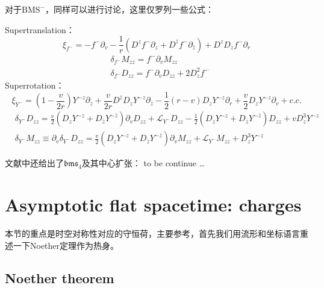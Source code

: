 对于$\text{BMS}^-$，同样可以进行讨论，这里仅罗列一些公式：

\noindent Supertranslation：
\begin{equation}
	\xi_{f^-}=-f^-\partial_v-\frac{1}{r}\left(D^zf^-\partial_z+D^{\bar z}f^-\partial_{\bar z}\right)+D^zD_zf^-\partial_r
\end{equation}
\begin{equation}
	\begin{aligned}
		&\delta_{f^-}M_{zz}=f^-\partial_v M_{zz}\\
		&\delta_{f^-}D_{zz}=f^-\partial_v D_{zz}+2D_z^2f^-
	\end{aligned}
\end{equation}
Superrotation：
\begin{equation}
	\xi_{Y^-}=\left(1-\frac{v}{2r}\right)Y^{-z}\partial_z+\frac{v}{2r}D^{\bar z}D_zY^{-z}\partial_{\bar z}-\frac{1}{2}(r-v)D_zY^{-z}\partial_r+\frac{v}{2}D_zY^{-z}\partial_v+c.c.
\end{equation}
\begin{equation}
	\begin{aligned}
		&\delta_{Y^-}D_{zz}=\frac{v}{2}\left(D_zY^{-z}+D_{\bar z}Y^{-\bar z} \right)\partial_v D_{zz}+\mathcal{L}_{Y^-}D_{zz}-\frac{1}{2}\left(D_zY^{-z}+D_{\bar z}Y^{-\bar z}\right)D_{zz}+vD^3_{z}Y^{-z}\\
		&\delta_{Y^-}M_{zz}\equiv\partial_v\delta_{Y^-}D_{zz}=\frac{v}{2}\left(D_zY^{-z}+D_{\bar z}Y^{-\bar z} \right)\partial_v M_{zz}+\mathcal{L}_{Y^-}M_{zz}+D^3_zY^{-z}
	\end{aligned}
\end{equation}

文献\cite{Barnich:2010ojg,Barnich:2010eb}中还给出了$\mathfrak{bms}_4$及其中心扩张：
to be continue \ldots
\section{Asymptotic flat spacetime: charges}
本节的重点是时空对称性对应的守恒荷，主要参考，首先我们用流形和坐标语言重述一下Noether定理作为热身。
\subsection{Noether theorem}